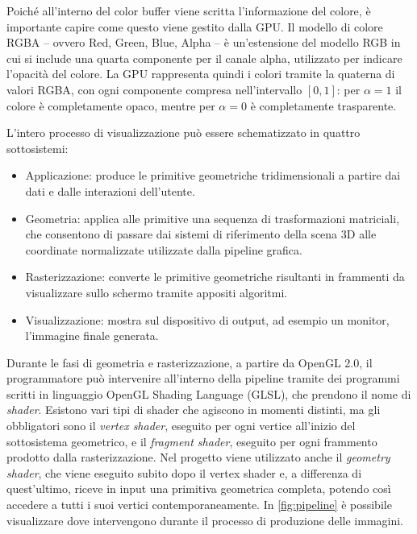Poiché all'interno del color buffer viene scritta l'informazione del colore, è importante capire come questo viene gestito dalla GPU.
Il modello di colore RGBA -- ovvero Red, Green, Blue, Alpha -- è un'estensione del modello RGB in cui si include una quarta componente per il canale alpha, utilizzato per indicare l'opacità del colore.
La GPU rappresenta quindi i colori tramite la quaterna di valori RGBA, con ogni componente compresa nell'intervallo $[0, 1]$: per $\alpha = 1$ il colore è completamente opaco, mentre per $\alpha = 0$ è completamente trasparente.

L'intero processo di visualizzazione può essere schematizzato in quattro sottosistemi:
\begin{itemize}
    \item Applicazione: produce le primitive geometriche tridimensionali a partire dai dati e dalle interazioni dell’utente.
    \item Geometria: applica alle primitive una sequenza di trasformazioni matriciali, che consentono di passare dai sistemi di riferimento della scena 3D alle coordinate normalizzate utilizzate dalla pipeline grafica.
    \item Rasterizzazione: converte le primitive geometriche risultanti in  frammenti da visualizzare sullo schermo tramite appositi algoritmi.
    \item Visualizzazione: mostra sul dispositivo di output, ad esempio un monitor, l'immagine finale generata.
\end{itemize}

Durante le fasi di geometria e rasterizzazione, a partire da OpenGL 2.0, il programmatore può intervenire all'interno della pipeline tramite dei programmi scritti in linguaggio OpenGL Shading Language (GLSL), che prendono il nome di \emph{shader}.
Esistono vari tipi di shader che agiscono in momenti distinti, ma gli obbligatori sono il \emph{vertex shader}, eseguito per ogni vertice all'inizio del sottosistema geometrico, e il \emph{fragment shader}, eseguito per ogni frammento prodotto dalla rasterizzazione.
Nel progetto viene utilizzato anche il \emph{geometry shader}, che viene eseguito subito dopo il vertex shader e, a differenza di quest'ultimo, riceve in input una primitiva geometrica completa, potendo così accedere a tutti i suoi vertici contemporaneamente.
In \cref{fig:pipeline} è possibile visualizzare dove intervengono durante il processo di produzione delle immagini.

